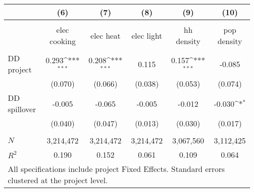 {
\def\sym#1{\ifmmode^{#1}\else\(^{#1}\)\fi}
\begin{tabular}{l*{5}{c}}
 & (6) & (7) & (8) & (9) & (10)  \\[0.2em]
\hline\\[-0.9em]

             & elec cooking & elec heat  & elec light & hh density   & pop density \\
[0.2em]\hline \\[-0.9em]

DD project   & 0.293\sym{***} & 0.208\sym{***} &  0.115      & 0.157\sym{***} &  -0.085  \\
             & (0.070)        & (0.066)        &  (0.038)    &(0.053)         &  (0.074)\\
[0.5em]
DD spillover & -0.005         & -0.065         &  -0.005     & -0.012  &  -0.030\sym{*} \\
             & (0.040)        & (0.047)        &  (0.013)    & (0.030) &  (0.017)     \\

\hline \\[-0.9em] 

\(N\)        & 3,214,472     &  3,214,472     &  3,214,472  &  3,067,560 &  3,112,425       \\
\(R^{2}\)    & 0.190         &    0.152       &    0.061    &    0.109   &    0.064         \\
\hline
\multicolumn{6}{l}{\tiny All specifications include project Fixed Effects. Standard errors clustered at the project level. }
\end{tabular}
}
